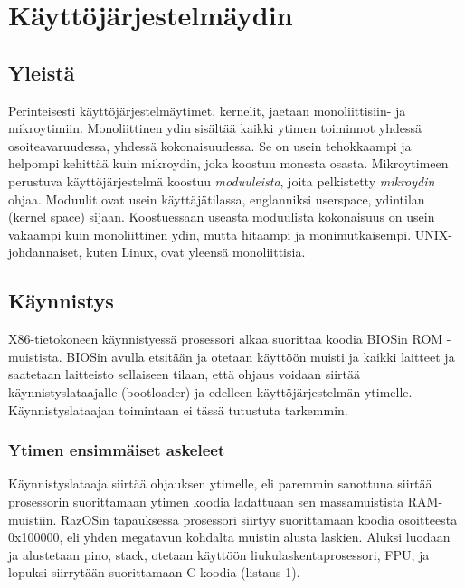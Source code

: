 \chapter{Käyttöjärjestelmäydin}

\label{kernel}

\section{Yleistä}

Perinteisesti käyttöjärjestelmäytimet, kernelit, jaetaan monoliittisiin- ja mikroytimiin. Monoliittinen ydin sisältää kaikki ytimen toiminnot yhdessä osoiteavaruudessa, yhdessä kokonaisuudessa. Se on usein tehokkaampi ja helpompi kehittää kuin mikroydin, joka koostuu monesta osasta. Mikroytimeen perustuva käyttöjärjestelmä koostuu \textit{moduuleista}, joita pelkistetty \textit{mikroydin} ohjaa. Moduulit ovat usein käyttäjätilassa, englanniksi userspace, ydintilan (kernel space) sijaan. Koostuessaan useasta moduulista kokonaisuus on usein vakaampi kuin monoliittinen ydin, mutta hitaampi ja monimutkaisempi. UNIX-johdannaiset, kuten Linux, ovat yleensä monoliittisia.

\section{Käynnistys}

X86-tietokoneen käynnistyessä prosessori alkaa suorittaa koodia BIOSin ROM -muistista. BIOSin avulla etsitään ja otetaan käyttöön muisti ja kaikki laitteet ja saatetaan laitteisto sellaiseen tilaan, että ohjaus voidaan siirtää käynnistyslataajalle (bootloader) ja edelleen käyttöjärjestelmän ytimelle. Käynnistyslataajan toimintaan ei tässä tutustuta tarkemmin.

\subsection{Ytimen ensimmäiset askeleet}
Käynnistyslataaja siirtää ohjauksen ytimelle, eli paremmin sanottuna siirtää prosessorin suorittamaan ytimen koodia ladattuaan sen massamuistista RAM-muistiin. RazOSin tapauksessa prosessori siirtyy suorittamaan koodia osoitteesta 0x100000, eli yhden megatavun kohdalta muistin alusta laskien. Aluksi luodaan ja alustetaan pino, stack, otetaan käyttöön liukulaskentaprosessori, FPU, ja lopuksi siirrytään suorittamaan C-koodia (listaus 1).

\par

